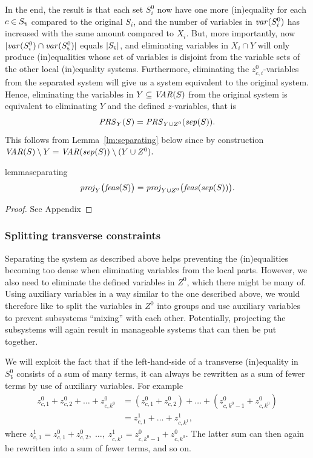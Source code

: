 In the end, the result is that each set $S_i^0$ now have one more (in)equality for each $c \in S_{\texttt{t}}$ %
compared to the original $S_i$, and the number of variables in $\mathit{var}(S_i^0)$ has increased with the same amount compared to $X_i$.
But, more importantly, now $|\mathit{var}(S_i^0)\cap \mathit{var}(S^0_{\texttt{t}})|$ equals $|S_{\texttt{t}}|$, and eliminating variables in $X_i\cap Y$ will only produce (in)equalities whose set of variables is disjoint from the variable sets of the other local (in)equality systems.
Furthermore, eliminating the $z^0_{c,i}$-variables from the separated system 
will give us a system equivalent to the original system. 
Hence, eliminating the variables in $Y\subseteq \mathit{VAR}(S)$ from the original system is equivalent to eliminating $Y$ and the defined $z$-variables, that is 
\[
\mathit{PRS}_Y(S) = \mathit{PRS}_{Y\cup Z^0}(\mathit{sep}(S)).
\]
This follows from Lemma~\ref{lm:separating} below since by construction $\mathit{VAR}(S)\setminus Y = \mathit{VAR}(\mathit{sep}(S))\setminus (Y\cup Z^0).$
\begin{restatable}{lemma}{separating}\label{lm:separating}
\[
\mathit{proj}_Y\big(\mathit{feas}(S)\big)=\mathit{proj}_{Y\cup Z^0}\big(\mathit{feas}(\mathit{sep}(S))\big).
\]
\end{restatable}
\begin{proof}
See Appendix
\end{proof}


\subsubsection{Splitting transverse constraints}
Separating the system as described above helps preventing the (in)equalities becoming too dense when eliminating variables from the local parts. However, we also need to eliminate the defined variables in $Z^0$, which there might be many of. Using auxiliary variables in a way similar to the one described above, we would therefore like to split the variables in $Z^0$ into groups and use auxiliary variables to prevent subsystems ``mixing'' with each other. Potentially, projecting the subsystems will again result in manageable systems that can then be put together.

We will exploit the fact that if the left-hand-side of a transverse (in)equality in $S^0_\texttt{t}$ consists of a sum of many terms, it can always be rewritten as a sum of fewer terms by use of auxiliary variables. For example
\begin{align*}
z^0_{c,1} + z^0_{c,2} + \ldots + z^0_{c,k^0} &=
(z^0_{c,1} + z^0_{c,2}) + \ldots + (z^0_{c,k^0-1} + z^0_{c, k^0}) \\
&= z^1_{c,1} + \ldots + z^1_{c,k^1},
\end{align*}
where $z^1_{c,1} = z^0_{c,1} + z^0_{c,2},\; \ldots,\; z^1_{c,k^1}=z^0_{c,k^0-1} + z^0_{c,k^0}$. The latter sum can then again be rewritten into a sum of fewer terms, and so on.

